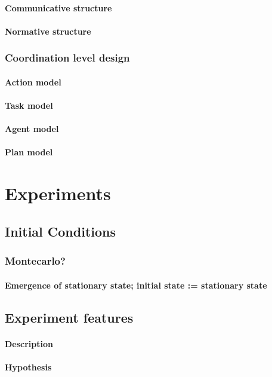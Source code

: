 \documentclass[11pt,oneside,a4paper,openright]{report}
\begin{document}
				\paragraph{Communicative structure}
				\paragraph{Normative structure}

			\subsubsection{Coordination level design}
				\paragraph{Action model}
				\paragraph{Task model}
				\paragraph{Agent model}
				\paragraph{Plan model}
	\section{Experiments}
		\subsection{Initial Conditions}
			\subsubsection{Montecarlo?} 
			\paragraph{Emergence of stationary state; initial state := stationary state}
		\subsection{Experiment features}
			\paragraph{Description}
			\paragraph{Hypothesis}
\end{document}
